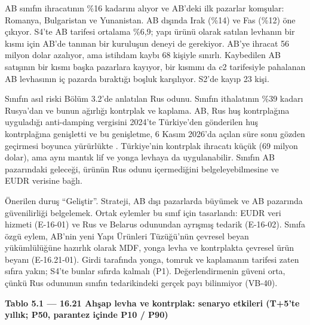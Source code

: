 AB sınıfın ihracatının \%16 kadarını alıyor ve AB'deki ilk pazarlar komşular: Romanya, Bulgaristan ve Yunanistan. AB dışında Irak (\%14) ve Fas (\%12) öne çıkıyor. S4'te AB tarifesi ortalama \%6,9; yapı ürünü olarak satılan levhanın bir kısmı için AB'de tanınan bir kuruluşun deneyi de gerekiyor. AB'ye ihracat 56 milyon dolar azalıyor, ama istihdam kaybı 68 kişiyle sınırlı. Kaybedilen AB satışının bir kısmı başka pazarlara kayıyor, bir kısmını da c2 tarifesiyle pahalanan AB levhasının iç pazarda bıraktığı boşluk karşılıyor. S2'de kayıp 23 kişi.

Sınıfın asıl riski Bölüm 3.2'de anlatılan Rus odunu. Sınıfın ithalatının \%39 kadarı Rusya'dan ve bunun ağırlığı kontrplak ve kaplama. AB, Rus huş kontrplağına uyguladığı anti-damping vergisini 2024'te Türkiye'den gönderilen huş kontrplağına genişletti ve bu genişletme, 6 Kasım 2026'da açılan süre sonu gözden geçirmesi boyunca yürürlükte \etiketV{}. Türkiye'nin kontrplak ihracatı küçük (69 milyon dolar), ama aynı mantık lif ve yonga levhaya da uygulanabilir. Sınıfın AB pazarındaki geleceği, ürünün Rus odunu içermediğini belgeleyebilmesine ve EUDR verisine bağlı.

Önerilen duruş ``Geliştir''. Strateji, AB dışı pazarlarda büyümek ve AB pazarında güvenilirliği belgelemek. Ortak eylemler bu sınıf için tasarlandı: EUDR veri hizmeti (E-16-01) ve Rus ve Belarus odunundan ayrışmış tedarik (E-16-02). Sınıfa özgü eylem, AB'nin yeni Yapı Ürünleri Tüzüğü'nün çevresel beyan yükümlülüğüne hazırlık olarak MDF, yonga levha ve kontrplakta çevresel ürün beyanı (E-16.21-01). Girdi tarafında yonga, tomruk ve kaplamanın tarifesi zaten sıfıra yakın; S4'te bunlar sıfırda kalmalı (P1). Değerlendirmenin güveni orta, çünkü Rus odununun sınıfın tedarikindeki gerçek payı bilinmiyor (VB-40).


\textbf{Tablo 5.1 --- 16.21 Ahşap levha ve kontrplak: senaryo etkileri (T+5'te yıllık; P50, parantez içinde P10 / P90)}

\nopagebreak[4]

\begingroup\gbtablo\small

